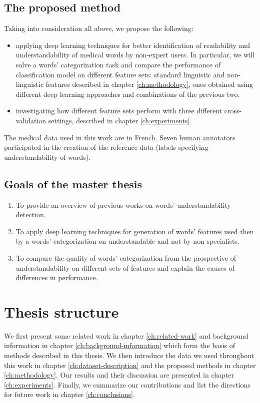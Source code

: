 \subsection{The proposed method}
Taking into consideration all above, we propose the following:
\begin{itemize}
    \item applying deep learning techniques for better identification of readability and understandability of medical words by non-expert users. In particular, we will solve a words' categorization task and compare the performance of classification model on different feature sets: standard linguistic and non-linguistic features described in chapter \ref{ch:methodology}, ones obtained using different deep learning approaches and combinations of the previous two.
    \item investigating how different feature sets perform with three different cross-validation settings, described in chapter \ref{ch:experiments}. 
\end{itemize}
The medical data used in this work are in French. Seven human annotators participated in the creation of the reference data (labels specifying understandability of words).

\subsection{Goals of the master thesis}
\begin{enumerate}
    \item To provide an overview of previous works on words' understandability detection.
    \item To apply deep learning techniques for generation of words' features used then by a words' categorization on understandable and not by non-specialists.
    \item To compare the quality of words' categorization from the prospective of understandability on different sets of features and explain the causes of differences in performance.
\end{enumerate}

\section{Thesis structure}
We first present some related work in chapter \ref{ch:related-work} and background information in chapter \ref{ch:background-information} which form the basis of methods described in this thesis. We then introduce the data we used throughout this work in chapter \ref{ch:dataset-description} and the proposed methods in chapter \ref{ch:methodology}. Our results and their discussion are presented in chapter \ref{ch:experiments}. Finally, we summarize our contributions and list the directions for future work in chapter \ref{ch:conclusions}.